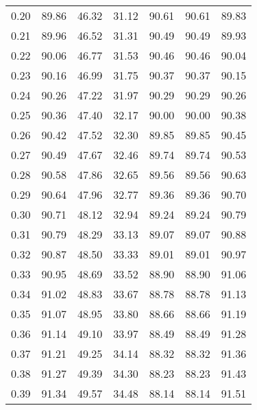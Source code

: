 \begin{tabular}{|c|c|c|c|c|c|c|}
      0.20 &     89.86 &     46.32 &      31.12 &   90.61 &      90.61 &         89.83 \\
      0.21 &     89.96 &     46.52 &      31.31 &   90.49 &      90.49 &         89.93 \\
      0.22 &     90.06 &     46.77 &      31.53 &   90.46 &      90.46 &         90.04 \\
      0.23 &     90.16 &     46.99 &      31.75 &   90.37 &      90.37 &         90.15 \\
      0.24 &     90.26 &     47.22 &      31.97 &   90.29 &      90.29 &         90.26 \\
      0.25 &     90.36 &     47.40 &      32.17 &   90.00 &      90.00 &         90.38 \\
      0.26 &     90.42 &     47.52 &      32.30 &   89.85 &      89.85 &         90.45 \\
      0.27 &     90.49 &     47.67 &      32.46 &   89.74 &      89.74 &         90.53 \\
      0.28 &     90.58 &     47.86 &      32.65 &   89.56 &      89.56 &         90.63 \\
      0.29 &     90.64 &     47.96 &      32.77 &   89.36 &      89.36 &         90.70 \\
      0.30 &     90.71 &     48.12 &      32.94 &   89.24 &      89.24 &         90.79 \\
      0.31 &     90.79 &     48.29 &      33.13 &   89.07 &      89.07 &         90.88 \\
      0.32 &     90.87 &     48.50 &      33.33 &   89.01 &      89.01 &         90.97 \\
      0.33 &     90.95 &     48.69 &      33.52 &   88.90 &      88.90 &         91.06 \\
      0.34 &     91.02 &     48.83 &      33.67 &   88.78 &      88.78 &         91.13 \\
      0.35 &     91.07 &     48.95 &      33.80 &   88.66 &      88.66 &         91.19 \\
      0.36 &     91.14 &     49.10 &      33.97 &   88.49 &      88.49 &         91.28 \\
      0.37 &     91.21 &     49.25 &      34.14 &   88.32 &      88.32 &         91.36 \\
      0.38 &     91.27 &     49.39 &      34.30 &   88.23 &      88.23 &         91.43 \\
      0.39 &     91.34 &     49.57 &      34.48 &   88.14 &      88.14 &         91.51 \\

\end{tabular}
